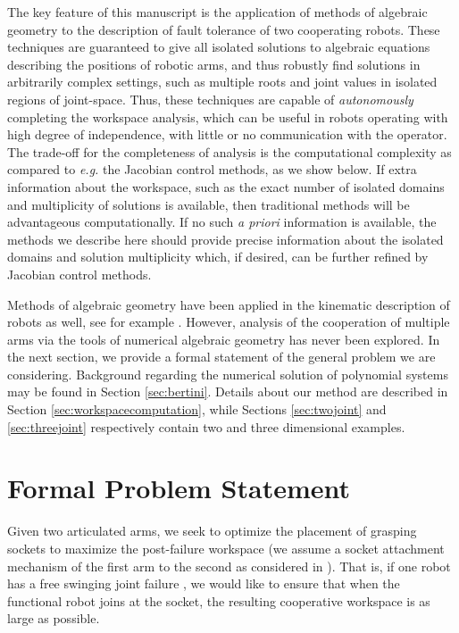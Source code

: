 \documentclass[12pt]{report}
\begin{document}
The key feature of this manuscript is the application of methods of algebraic geometry to the description of fault tolerance of two cooperating robots.  
These techniques are guaranteed to give all isolated solutions to algebraic equations describing the positions of robotic arms, and thus robustly find solutions in arbitrarily complex settings, such as multiple roots and joint values in isolated regions of joint-space. 
Thus, these techniques are capable of \emph{autonomously} completing the workspace analysis, which can be useful in robots operating with high degree of independence, with little or no communication with the operator. The trade-off for the completeness of analysis is the computational complexity as compared to \emph{e.g.} the Jacobian control methods, as we show below.  If extra information about the workspace, such as the exact number of isolated domains and multiplicity of solutions is available, then traditional methods will be advantageous computationally. If no such \emph{a priori}  information is available, the methods we describe here should provide precise information about the isolated domains and solution multiplicity which, if desired, can be further refined by Jacobian control methods. 


Methods of algebraic geometry have been applied in the kinematic description of robots as well,  see for example \cite{SW05,SVW04,WM93,WMS92,WaHaSo11}. However, analysis of the cooperation of multiple arms via the tools of numerical algebraic geometry has never been explored.  
In the next section, we provide a formal statement of the general problem we are considering.  Background regarding the numerical solution of polynomial systems may be found in Section \ref{sec:bertini}.  Details about our method are described in Section \ref{sec:workspacecomputation}, while Sections \ref{sec:twojoint} and \ref{sec:threejoint} respectively contain two and three dimensional examples.



\section{Formal Problem Statement} \label{sec:probstatement}

Given two articulated arms, we seek to optimize the placement of grasping sockets to maximize the post-failure workspace (we assume a socket attachment mechanism of the first arm to the second as considered in  \cite{AgPa2009}). That is, if one robot has a free swinging joint failure \cite{EnMa2000,EnMa2001}, we would like to ensure that when the functional robot joins at the socket, the resulting cooperative workspace is as large as possible. 
\end{document}
